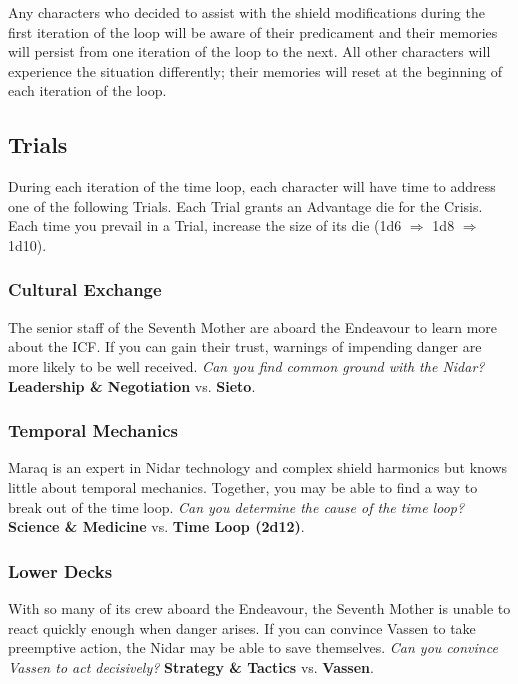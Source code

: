 \documentclass[11pt, a5paper, parskip=half-, DIV=12]{scrartcl}
\begin{document}
Any characters who decided to assist with the shield modifications during the first iteration of the loop will be aware of their predicament and their memories will persist from one iteration of the loop to the next. All other characters will experience the situation differently; their memories will reset at the beginning of each iteration of the loop.
\newpage

\subsection*{Trials}
During each iteration of the time loop, each character will have time to address one of the following Trials.
Each Trial grants an Advantage die for the Crisis. Each time you prevail in a Trial, increase the size of its die (1d6 $\Longrightarrow$ 1d8 $\Longrightarrow$ 1d10). 

\subsubsection*{Cultural Exchange}
The senior staff of the Seventh Mother
are aboard the Endeavour to learn more about the ICF.
If you can gain their trust, warnings of impending danger are more likely to be well received. \textit{Can you find common ground with the Nidar?} \textbf{Leadership \& Negotiation} vs. \textbf{Sieto}.

\subsubsection*{Temporal Mechanics}
Maraq is an expert in Nidar technology and complex shield harmonics but knows little about temporal mechanics. Together, you may be able to find a way to break out of the time loop. \textit{Can you determine the cause of the time loop?} \textbf{Science \& Medicine} vs. \textbf{Time Loop (2d12)}.

\subsubsection*{Lower Decks}
With so many of its crew aboard the Endeavour, the Seventh Mother is unable to react quickly enough when danger arises. If you can convince Vassen to take preemptive action, the Nidar may be able to save themselves. \textit{Can you convince Vassen to act decisively?} \textbf{Strategy \& Tactics} vs. \textbf{Vassen}.
\end{document}
